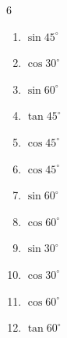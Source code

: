 \begin{multicols}{6}
\begin{enumerate}

  \item $\displaystyle \sin{45^\circ}$


  \item $\displaystyle \cos{30^\circ}$


  \item $\displaystyle \sin{60^\circ}$


  \item $\displaystyle \tan{45^\circ}$

        \phantom{$\displaystyle =1$}

  \item $\displaystyle \cos{45^\circ}$


  \item $\displaystyle \cos{45^\circ}$


  \item $\displaystyle \sin{60^\circ}$


  \item $\displaystyle \cos{60^\circ}$


  \item $\displaystyle \sin{30^\circ}$


  \item $\displaystyle \cos{30^\circ}$


  \item $\displaystyle \cos{60^\circ}$


  \item $\displaystyle \tan{60^\circ}$



\end{enumerate}
\end{multicols}
